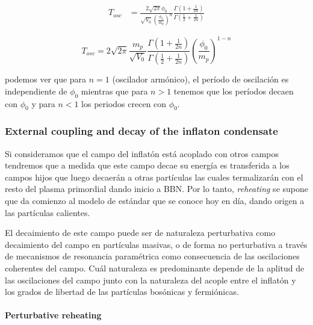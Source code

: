 \begin{equation*}
    \begin{split}
        T_{osc} &= \frac{2 \sqrt{2 \pi} \phi_0}{\displaystyle \sqrt{V_0} \left( \frac{\phi_0}{m_p} \right)^n} \frac{\displaystyle \Gamma \left( 1 + \frac{1}{2n} \right)}{\displaystyle \Gamma \left( \frac{1}{2} + \frac{1}{2n} \right)}
    \end{split}
\end{equation*}

\begin{equation}
    T_{osc} = 2 \sqrt{2\pi} \frac{m_p}{\sqrt{V_0}} \frac{\displaystyle \Gamma \left( 1 + \frac{1}{2n} \right)}{\displaystyle \Gamma \left( \frac{1}{2} + \frac{1}{2n} \right)} \left( \frac{\phi_0}{m_p} \right)^{1 - n} 
\end{equation}

\noindent
podemos ver que para $n = 1$ (oscilador armónico), el período de oscilación es independiente de $\phi_0$ mientras que para $n > 1$ tenemos que los períodos decaen con $\phi_0$ y para $n < 1$ los periodos crecen con $\phi_0$.

\subsubsection{External coupling and decay of the inflaton condensate}

Si consideramos que el campo del inflatón está acoplado con otros campos tendremos que a medida que este campo decae su energía es transferida a los campos hijos que luego decaerán a otras partículas las cuales termalizarán con el resto del plasma primordial dando inicio a BBN. Por lo tanto, \textit{reheating} se supone que da comienzo al modelo de estándar que se conoce hoy en día, dando origen a las partículas calientes.

El decaimiento de este campo puede ser de naturaleza perturbativa como decaimiento del campo en partículas masivas, o de forma no perturbativa a través de mecanismos de resonancia paramétrica como consecuencia de las oscilaciones coherentes del campo. Cuál naturaleza es predominante depende de la aplitud de las oscilaciones del campo junto con la naturaleza del acople entre el inflatón y los grados de libertad de las partículas bosónicas y fermiónicas.

\paragraph{Perturbative reheating}

